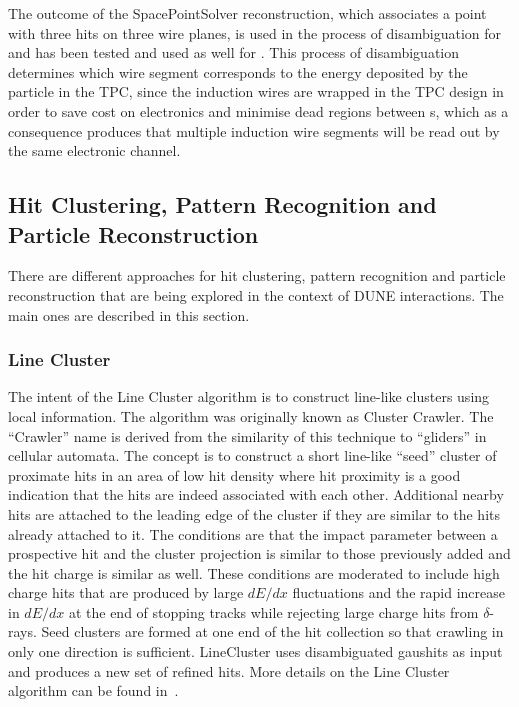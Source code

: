 The outcome of the SpacePointSolver reconstruction, which associates a \threed point with three hits on three wire planes, is used in the process of disambiguation for  and has been tested and used as well for . This process of disambiguation determines which wire segment corresponds to the energy deposited by the particle in the TPC, since the induction wires are wrapped in the  TPC design in order to save cost on electronics and minimise dead regions between s, which as a consequence produces that multiple induction wire segments will be read out by the same electronic channel.





\subsection{Hit Clustering, Pattern Recognition and Particle Reconstruction}

There are different approaches for hit clustering, pattern recognition and particle reconstruction that are being explored in the context of DUNE  interactions. The main ones are described in this section.  

\subsubsection{Line Cluster}\label{sec:LineCluster}
The intent of the Line Cluster algorithm is to construct \twod line-like clusters using local information. The algorithm was originally known as Cluster Crawler. The ``Crawler'' name is derived from the similarity of this technique to ``gliders'' in \twod cellular automata. The concept is to construct a short line-like ``seed'' cluster of proximate hits in an area of low hit density where hit proximity is a good indication that the hits are indeed associated with each other. Additional nearby hits are attached to the leading edge of the cluster if they are similar to the hits already attached to it. The conditions are that the impact parameter between a prospective hit and the cluster projection is similar to those previously added and the hit charge is similar as well. These conditions are moderated to include high charge hits that are produced by large $dE/dx$ fluctuations and the rapid increase in $dE/dx$ at the end of stopping tracks while rejecting large charge hits from $\delta$-rays.
Seed clusters are formed at one end of the hit collection so that crawling in only one direction is sufficient. LineCluster uses disambiguated gaushits as input and produces a new set of refined hits. More details on the Line Cluster algorithm can be found in~\cite{ref:linecluster}.

